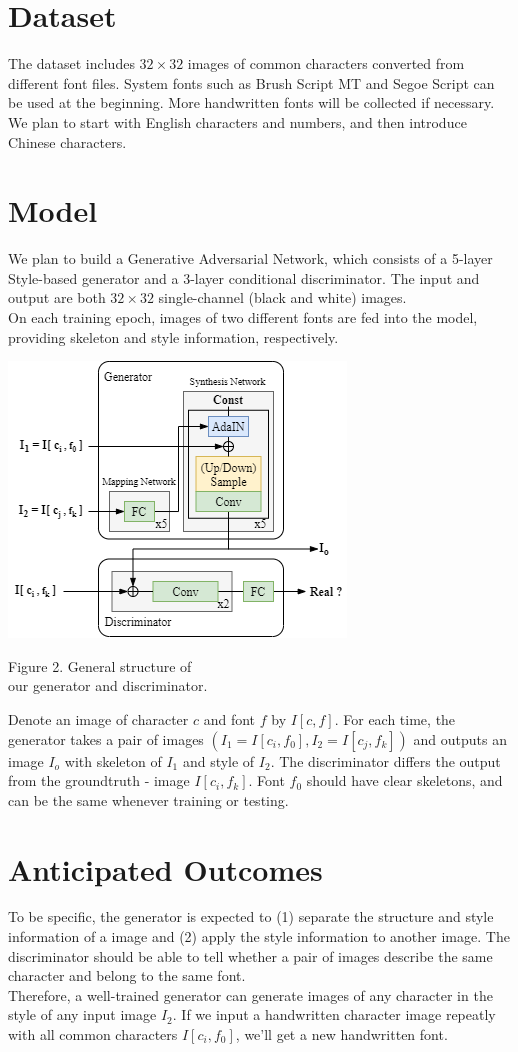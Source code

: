 \documentclass[letterpaper]{article}
\begin{document}
\section{Dataset}
The dataset includes $32 \times 32$ images of common characters converted from different font files. System fonts such as Brush Script MT and Segoe Script can be used at the beginning. More handwritten fonts will be collected if necessary. We plan to start with English characters and numbers, and then introduce Chinese characters.

\section{Model}
We plan to build a Generative Adversarial Network, which consists of a 5-layer Style-based generator and a 3-layer conditional discriminator. The input and output are both $32 \times 32$ single-channel (black and white) images.
\\
On each training epoch, images of two different fonts are fed into the model, providing skeleton and style information, respectively.
\begin{center}
    \includegraphics[scale=0.7]{plan-fig-model.png}

    Figure 2. General structure of\\our generator and discriminator. 
\end{center}
Denote an image of character $c$ and font $f$ by $I[c,f]$. For each time, the generator takes a pair of images $(I_1=I[c_i,f_0], I_2=I[c_j,f_k])$ and outputs an image $I_o$ with skeleton of $I_1$ and style of $I_2$. The discriminator differs the output from the groundtruth - image $I[c_i,f_k]$. Font $f_0$ should have clear skeletons, and can be the same whenever training or testing.

\section{Anticipated Outcomes}
To be specific, the generator is expected to (1) separate the structure and style information of a image and (2) apply the style information to another image. The discriminator should be able to tell whether a pair of images describe the same character and belong to the same font.
\\
Therefore, a well-trained generator can generate images of any character in the style of any input image $I_2$. If we input a handwritten character image repeatly with all common characters $I[c_i,f_0]$, we'll get a new handwritten font.
\end{document}
